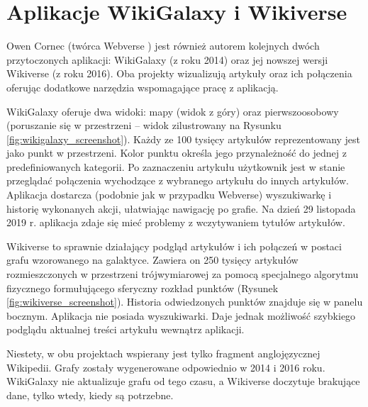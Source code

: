 \section{Aplikacje WikiGalaxy i Wikiverse}

Owen Cornec (twórca Webverse \cite{Webverse}) jest również autorem kolejnych dwóch przytoczonych aplikacji: WikiGalaxy \cite{WikiGalaxy} (z roku 2014) oraz jej nowszej wersji Wikiverse\cite{Wikiverse} (z roku 2016). Oba projekty wizualizują artykuły oraz ich połączenia oferując dodatkowe narzędzia wspomagające pracę z aplikacją.

WikiGalaxy oferuje dwa widoki: mapy (widok z góry) oraz pierwszoosobowy (poruszanie się w przestrzeni – widok zilustrowany na Rysunku \ref{fig:wikigalaxy_screenshot}). Każdy ze 100 tysięcy artykułów reprezentowany jest jako punkt w przestrzeni. Kolor punktu określa jego przynależność do jednej z predefiniowanych kategorii. Po zaznaczeniu artykułu użytkownik jest w stanie przeglądać połączenia wychodzące z wybranego artykułu do innych artykułów. Aplikacja dostarcza (podobnie jak w przypadku Webverse) wyszukiwarkę i historię wykonanych akcji, ułatwiając nawigację po grafie. Na dzień 29 listopada 2019 r. aplikacja zdaje się mieć problemy z wczytywaniem tytułów artykułów.


Wikiverse to sprawnie działający podgląd artykułów i ich połączeń w postaci grafu wzorowanego na galaktyce. Zawiera on 250 tysięcy artykułów rozmieszczonych w przestrzeni trójwymiarowej za pomocą specjalnego algorytmu fizycznego formułującego sferyczny rozkład punktów (Rysunek \ref{fig:wikiverse_screenshot}). Historia odwiedzonych punktów znajduje się w panelu bocznym. Aplikacja nie posiada wyszukiwarki. Daje jednak możliwość szybkiego podglądu aktualnej treści artykułu wewnątrz aplikacji.

Niestety, w obu projektach wspierany jest tylko fragment anglojęzycznej Wikipedii. Grafy zostały wygenerowane odpowiednio w 2014 i 2016 roku. WikiGalaxy nie aktualizuje grafu od tego czasu, a Wikiverse doczytuje brakujące dane, tylko wtedy, kiedy są potrzebne.

